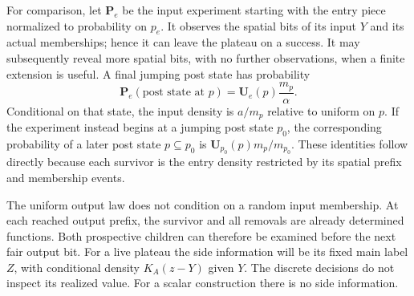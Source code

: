 For comparison, let $\mathbf P_e$ be the input experiment starting with the
entry piece normalized to probability on $p_e$. It observes the spatial bits
of its input $Y$ and its actual memberships; hence it can leave the plateau
on a success. It may subsequently reveal more spatial bits, with no further
observations, when a finite extension is useful. A final jumping post state
has probability
\begin{equation}\label{eq:07-state-conversion}
 \mathbf P_e(\text{post state at }p)
       =\mathbf U_e(p)\frac{m_p}{\alpha}.
\end{equation}
Conditional on that state, the input density is $a/m_p$ relative to uniform
on $p$. If the experiment instead begins at a jumping post state $p_0$, the
corresponding probability of a later post state $p\subseteq p_0$ is
$\mathbf U_{p_0}(p)m_p/m_{p_0}$. These identities follow directly because
each survivor is the entry density restricted by its spatial prefix and
membership events.

The uniform output law does not condition on a random input membership. At
each reached output prefix, the survivor and all removals are already
determined functions. Both prospective children can therefore be examined
before the next fair output bit. For a live plateau the side information
will be its fixed main label $Z$, with conditional density $K_A(z-Y)$ given
$Y$. The discrete decisions do not inspect its realized value. For a scalar
construction there is no side information.


